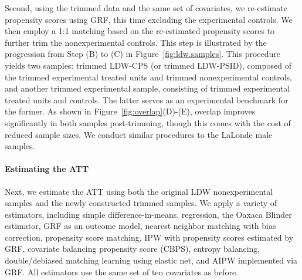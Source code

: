 \documentclass[letterpaper,12pt,leqno]{article}
\begin{document}
Second, using the trimmed data and the same set of covariates, we re-estimate propensity scores using GRF, this time excluding the experimental controls. We then employ a 1:1 matching based on the re-estimated propensity scores to further trim the nonexperimental controls. This step is illustrated by the progression from Step (B) to (C) in Figure~\ref{fig:ldw.samples}. This procedure yields two samples: trimmed LDW-CPS (or trimmed LDW-PSID), composed of the trimmed experimental treated units and trimmed nonexperimental controls, and another trimmed experimental sample, consisting of trimmed experimental treated units and controls. The latter serves as an experimental benchmark for the former. As shown in Figure~\ref{fig:overlap}(D)-(E), overlap improves significantly in both samples post-trimming, though this comes with the cost of reduced sample sizes. We conduct similar procedures to the LaLonde male samples. 



\paragraph{Estimating the ATT} Next, we estimate the ATT using both the original LDW nonexperimental samples and the newly constructed trimmed samples. We apply a variety of estimators, including simple difference-in-means, regression, the Oaxaca Blinder estimator, GRF as an outcome model, nearest neighbor matching with bias correction, propensity score matching, IPW with propensity scores estimated by GRF, covariate balancing propensity score (CBPS), entropy balancing, double/debiased matching learning using elastic net, and AIPW implemented via GRF. All estimators use the same set of ten covariates as before. 
\end{document}
